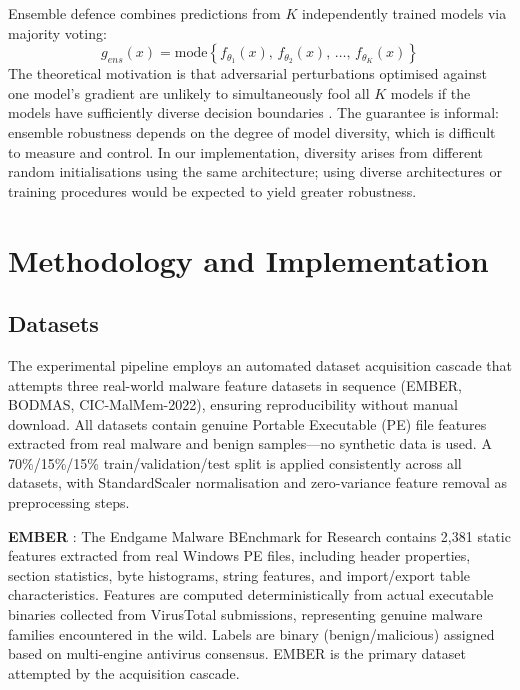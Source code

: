 \documentclass[conference]{IEEEtran}
\begin{document}
Ensemble defence combines predictions from $K$ independently trained models via majority voting:
\begin{equation}
g_{ens}(x) = \text{mode}\!\left\{f_{\theta_1}(x),\, f_{\theta_2}(x),\, \ldots,\, f_{\theta_K}(x)\right\}
\end{equation}
The theoretical motivation is that adversarial perturbations optimised against one model's gradient are unlikely to simultaneously fool all $K$ models if the models have sufficiently diverse decision boundaries \cite{lakshminarayanan2017}. The guarantee is informal: ensemble robustness depends on the degree of model diversity, which is difficult to measure and control. In our implementation, diversity arises from different random initialisations using the same architecture; using diverse architectures or training procedures would be expected to yield greater robustness.

\section{Methodology and Implementation}
\label{sec:methodology}

\subsection{Datasets}

The experimental pipeline employs an automated dataset acquisition cascade that attempts three real-world malware feature datasets in sequence (EMBER, BODMAS, CIC-MalMem-2022), ensuring reproducibility without manual download. All datasets contain genuine Portable Executable (PE) file features extracted from real malware and benign samples---no synthetic data is used. A 70\%/15\%/15\% train/validation/test split is applied consistently across all datasets, with StandardScaler normalisation and zero-variance feature removal as preprocessing steps.

\textbf{EMBER} \cite{anderson2018}: The Endgame Malware BEnchmark for Research contains 2,381 static features extracted from real Windows PE files, including header properties, section statistics, byte histograms, string features, and import/export table characteristics. Features are computed deterministically from actual executable binaries collected from VirusTotal submissions, representing genuine malware families encountered in the wild. Labels are binary (benign/malicious) assigned based on multi-engine antivirus consensus. EMBER is the primary dataset attempted by the acquisition cascade.
\end{document}
